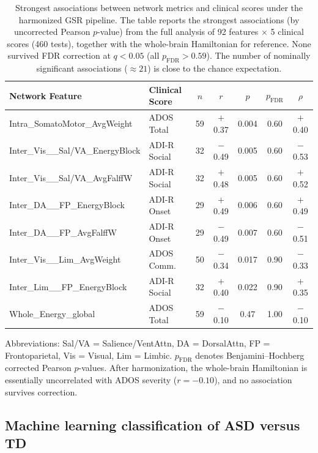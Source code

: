 \documentclass[10pt,letterpaper]{article}
\begin{document}
\begin{table}[ht]
\centering
\small
\caption{Strongest associations between network metrics and clinical scores under the harmonized GSR
pipeline. The table reports the strongest associations (by uncorrected Pearson $p$-value) from the
full analysis of 92 features $\times$ 5 clinical scores (460 tests), together with the whole-brain
Hamiltonian for reference. None survived FDR correction at $q < 0.05$ (all $p_{\mathrm{FDR}} > 0.59$).
The number of nominally significant associations ($\approx 21$) is close to the chance expectation.}
\label{tab:behaviour_corr_expanded}
\scriptsize
\begin{tabular}{p{4.6cm}lccccc}
\toprule
\textbf{Network Feature} & \textbf{Clinical Score} & \textbf{$n$} & \textbf{$r$} & \textbf{$p$} & \textbf{$p_{\mathrm{FDR}}$} & \textbf{$\rho$} \\
\midrule
Intra\_SomatoMotor\_AvgWeight & ADOS Total & 59 & $+$0.37 & 0.004 & 0.60 & $+$0.40 \\
Inter\_Vis\_\_Sal/VA\_EnergyBlock & ADI-R Social & 32 & $-$0.49 & 0.005 & 0.60 & $-$0.53 \\
Inter\_Vis\_\_Sal/VA\_AvgFalffW & ADI-R Social & 32 & $+$0.48 & 0.005 & 0.60 & $+$0.52 \\
Inter\_DA\_\_FP\_EnergyBlock & ADI-R Onset & 29 & $+$0.49 & 0.006 & 0.60 & $+$0.49 \\
Inter\_DA\_\_FP\_AvgFalffW & ADI-R Onset & 29 & $-$0.49 & 0.007 & 0.60 & $-$0.51 \\
Inter\_Vis\_\_Lim\_AvgWeight & ADOS Comm. & 50 & $-$0.34 & 0.017 & 0.90 & $-$0.33 \\
Inter\_Lim\_\_FP\_EnergyBlock & ADI-R Social & 32 & $+$0.40 & 0.022 & 0.90 & $+$0.35 \\
Whole\_Energy\_global & ADOS Total & 59 & $-$0.10 & 0.47 & 1.00 & $-$0.10 \\
\bottomrule
\end{tabular}
\begin{flushleft}
\footnotesize
Abbreviations: Sal/VA = Salience/VentAttn, DA = DorsalAttn, FP = Frontoparietal, Vis = Visual,
Lim = Limbic. $p_{\mathrm{FDR}}$ denotes Benjamini--Hochberg corrected Pearson $p$-values. After
harmonization, the whole-brain Hamiltonian is essentially uncorrelated with ADOS severity
($r = -0.10$), and no association survives correction.
\end{flushleft}
\end{table}

\subsection*{Machine learning classification of ASD versus TD}
\end{document}
